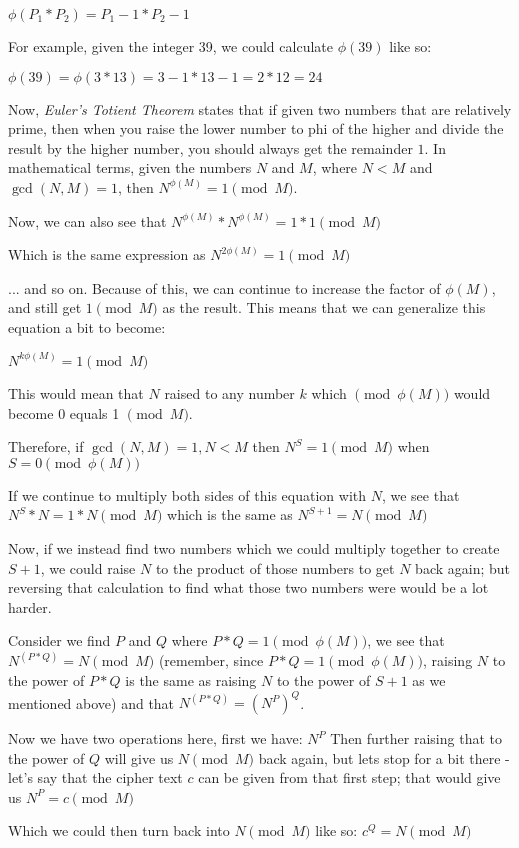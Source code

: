 $\phi(P_1*P_2) = P_1-1 * P_2-1$


For example, given the integer 39, we could calculate $\phi(39)$ like so:

$\phi(39) = \phi(3*13) = 3-1 * 13-1 = 2 * 12 = 24$

Now, \textit{Euler's Totient Theorem} states that if given two numbers that are relatively prime, then when you raise the lower number to phi of the higher and divide the result by the higher number, you should always get the remainder $1$. 
In mathematical terms, given the numbers $N$ and $M$, where $N<M$ and $\gcd(N,M)=1$, then $N^{\phi(M)} = 1 \pmod{M}$.

Now, we can also see that
$N^{\phi(M)} * N^{\phi(M)} = 1 * 1 \pmod{M}$

Which is the same expression as 
$N^{2\phi(M)} = 1 \pmod{M}$

... and so on. Because of this, we can continue to increase the factor of $\phi(M)$, and still get $1 \pmod{M}$ as the result. This means that we can generalize this equation a bit to become:

$N^{k\phi(M)} = 1 \pmod{M}$

This would mean that $N$ raised to any number $k$ which $\pmod{\phi(M)}$ would become 0 equals 1 $\pmod{M}$.

Therefore, if $\gcd(N,M) = 1, N < M$ then $N^S = 1 \pmod{M}$ when $S = 0 \pmod{\phi(M)}$

If we continue to multiply both sides of this equation with $N$, we see that $N^S * N = 1 * N \pmod{M}$ which is the same as $N^{S+1} = N \pmod{M}$

Now, if we instead find two numbers which we could multiply together to create $S+1$, we could raise $N$ to the product of those numbers to get $N$ back again; but reversing that calculation to find what those two numbers were would be a lot harder.

Consider we find $P$ and $Q$ where $P*Q = 1 \pmod{\phi(M)}$, we see that $N^{(P*Q)} = N \pmod{M}$ (remember, since $P*Q = 1 \pmod{\phi(M)}$, raising $N$ to the power of $P*Q$ is the same as raising $N$ to the power of $S+1$ as we mentioned above) and that $N^{(P*Q)} = (N^P)^Q$.

Now we have two operations here, first we have:
$N^P$
Then further raising that to the power of $Q$ will give us $N \pmod{M}$ back again, but lets stop for a bit there - let's say that the cipher text $c$ can be given from that first step; that would give us
$N^P = c \pmod{M}$

Which we could then turn back into $N \pmod{M}$ like so:
$c^Q = N \pmod{M}$

